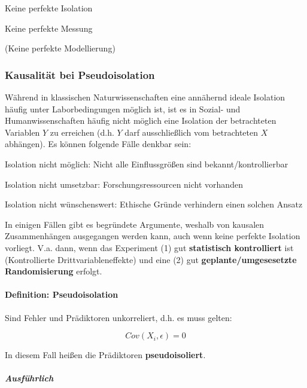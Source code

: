 \documentclass{article}
\numberwithin{equation}{section}
\begin{document}
\begin{compactitem}
\item Keine perfekte Isolation
\item Keine perfekte Messung
\item (Keine perfekte Modellierung)
\end{compactitem}

\subsubsection{Kausalität bei Pseudoisolation}

Während in klassischen Naturwissenschaften eine annähernd ideale Isolation häufig unter Laborbedingungen möglich ist, ist es in Sozial- und Humanwissenschaften häufig nicht möglich eine Isolation der betrachteten Variablen $Y$ zu erreichen (d.h. $Y$ darf ausschließlich vom betrachteten $X$ abhängen). Es können folgende Fälle denkbar sein:

\begin{compactitem}
\item Isolation nicht möglich: Nicht alle Einflussgrößen sind bekannt/kontrollierbar
\item Isolation nicht umsetzbar: Forschungsressourcen nicht vorhanden
\item Isolation nicht wünschenswert: Ethische Gründe verhindern einen solchen Ansatz
\end{compactitem}

In einigen Fällen gibt es begründete Argumente, weshalb von kausalen Zusammenhängen ausgegangen werden kann, auch wenn keine perfekte Isolation vorliegt. V.a. dann, wenn das Experiment (1) gut \textbf{statistisch kontrolliert} ist (Kontrollierte Drittvariableneffekte) und eine (2) gut \textbf{geplante/umgesesetzte Randomisierung} erfolgt.

\paragraph*{Definition: Pseudoisolation}

Sind Fehler und Prädiktoren unkorreliert, d.h. es muss gelten:

\begin{equation}
\label{eq:kausa-unkorr}
Cov(X_i,\epsilon) = 0
\end{equation}

In diesem Fall heißen die Prädiktoren \textbf{pseudoisoliert}.

\subparagraph*{Ausführlich}
\end{document}
